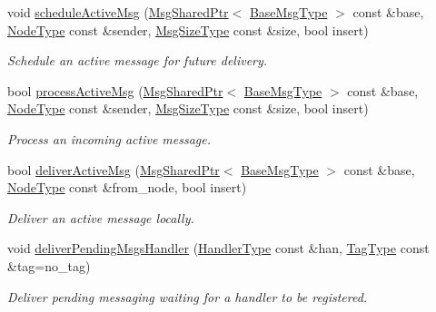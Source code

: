 \begin{DoxyCompactItemize}
void \hyperlink{structvt_1_1messaging_1_1_active_messenger_a5eaa416933b275ead18538fb64f2c484}{schedule\+Active\+Msg} (\hyperlink{structvt_1_1messaging_1_1_msg_shared_ptr}{Msg\+Shared\+Ptr}$<$ \hyperlink{namespacevt_a44d0d4e144748f2b19a1cfd962f50338}{Base\+Msg\+Type} $>$ const \&base, \hyperlink{namespacevt_a866da9d0efc19c0a1ce79e9e492f47e2}{Node\+Type} const \&sender, \hyperlink{namespacevt_abfa009d900299ac1df967b40ea8f2c8a}{Msg\+Size\+Type} const \&size, bool insert)
\begin{DoxyCompactList}\small\item\em Schedule an active message for future delivery. \end{DoxyCompactList}\item 
bool \hyperlink{structvt_1_1messaging_1_1_active_messenger_a17a17df828b8b8fb4b4df12509ce51ce}{process\+Active\+Msg} (\hyperlink{structvt_1_1messaging_1_1_msg_shared_ptr}{Msg\+Shared\+Ptr}$<$ \hyperlink{namespacevt_a44d0d4e144748f2b19a1cfd962f50338}{Base\+Msg\+Type} $>$ const \&base, \hyperlink{namespacevt_a866da9d0efc19c0a1ce79e9e492f47e2}{Node\+Type} const \&sender, \hyperlink{namespacevt_abfa009d900299ac1df967b40ea8f2c8a}{Msg\+Size\+Type} const \&size, bool insert)
\begin{DoxyCompactList}\small\item\em Process an incoming active message. \end{DoxyCompactList}\item 
bool \hyperlink{structvt_1_1messaging_1_1_active_messenger_a9280f5b21fe3d311171b865e7e1929cf}{deliver\+Active\+Msg} (\hyperlink{structvt_1_1messaging_1_1_msg_shared_ptr}{Msg\+Shared\+Ptr}$<$ \hyperlink{namespacevt_a44d0d4e144748f2b19a1cfd962f50338}{Base\+Msg\+Type} $>$ const \&base, \hyperlink{namespacevt_a866da9d0efc19c0a1ce79e9e492f47e2}{Node\+Type} const \&from\+\_\+node, bool insert)
\begin{DoxyCompactList}\small\item\em Deliver an active message locally. \end{DoxyCompactList}\item 
void \hyperlink{structvt_1_1messaging_1_1_active_messenger_a0119aa4565a2268b55cd836b753c2afd}{deliver\+Pending\+Msgs\+Handler} (\hyperlink{namespacevt_af64846b57dfcaf104da3ef6967917573}{Handler\+Type} const \&han, \hyperlink{namespacevt_a84ab281dae04a52a4b243d6bf62d0e52}{Tag\+Type} const \&tag=no\+\_\+tag)
\begin{DoxyCompactList}\small\item\em Deliver pending messaging waiting for a handler to be registered. \end{DoxyCompactList}\item 

\end{DoxyCompactItemize}
